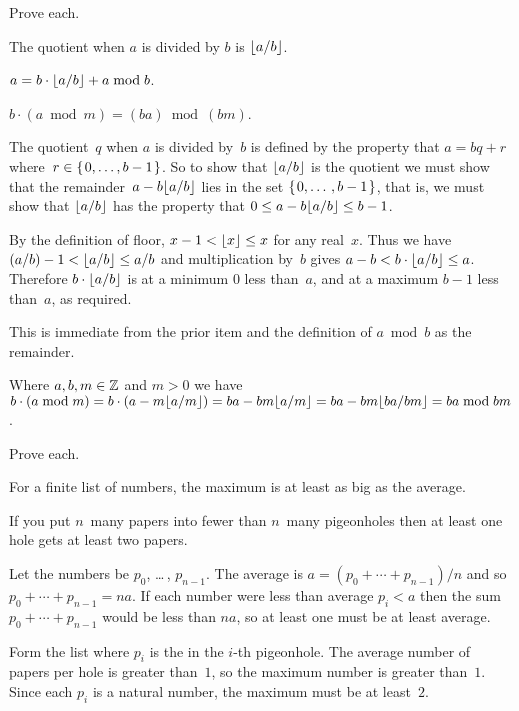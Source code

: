 \documentclass{ibl}
\begin{document}
\begin{ex} Prove each.
\begin{exes} 
\item The quotient when $a$ is divided by $b$ is $\lfloor a/b \rfloor$.
\item $a =b\cdot\lfloor a/b \rfloor+a\bmod b$.    
\item $b\cdot(a\bmod m)=(ba)\bmod{(bm)}$.    
\end{exes}
\begin{ans}
\begin{exes}
\item The quotient~$q$ when $a$ is divided by~$b$ is defined by the
  property that $a=bq+r$ where~$r\in\mbox{$\{\hspace{0.1em}0,\ldots,b-1\hspace{0.1em}\}$}$.
  So to show that $\lfloor a/b \rfloor$ is the quotient we must show that 
  the remainder~$a-b\lfloor a/b \rfloor$
  lies in the set $\mbox{$\{\hspace{0.1em}0,\ldots\,,b-1\hspace{0.1em}\}$}$, that is, 
  we must show that $\lfloor a/b \rfloor$ has the property 
  that $0\leq a-b\lfloor a/b \rfloor\leq b-1$.
  
  By the definition of floor, $x-1<\lfloor x \rfloor\leq x$ for any real~$x$. 
  Thus we have
  $(a/b)-1< \lfloor a/b \rfloor\leq a/b$ and multiplication by~$b$ gives
  $a-b< b\cdot\lfloor a/b \rfloor\leq a$.
  Therefore $b\cdot\lfloor a/b \rfloor$ is at a minimum $0$ less than~$a$, and
  at a maximum $b-1$ less than~$a$, as required.
\item This is immediate from the prior item and the 
  definition of $a\bmod b$ as the remainder.
\item Where $a, b, m\in\mathbb{Z}$ and $m>0$ we have
  $b\cdot(a\bmod m)=b\cdot(a-m\lfloor a/m \rfloor)
  =ba- bm\lfloor a/m \rfloor
  =ba- bm\lfloor ba/bm \rfloor
  =ba\bmod bm$.    
\end{exes}
\end{ans}
\end{ex}


\begin{ex}  Prove each.
\begin{exes}
\item For a finite list of numbers,
  the maximum is at least as big as the average.
\item If you put $n$~many papers into fewer than $n$~many 
  pigeonholes then at least one hole gets at least two papers.    
\end{exes}
\begin{ans}
\begin{exes}
\item Let the numbers be $p_0$, \ldots\,, $p_{n-1}$.
  The average is $a=(p_0+\cdots+p_{n-1})/n$ and so 
  $p_0+\cdots+p_{n-1}=na$.
  If each number were less than average $p_i<a$ then the sum
  $p_0+\cdots+p_{n-1}$ would be less than $na$, so at least
  one must be at least average.
\item Form the list where $p_i$ is the in the $i$-th pigeonhole.
  The average number of papers per hole is greater than~$1$, 
  so the maximum number is greater than~$1$.
  Since each $p_i$ is a natural number, the maximum must be at least~$2$.      
\end{exes}
\end{ans}
\end{ex}
\end{document}
